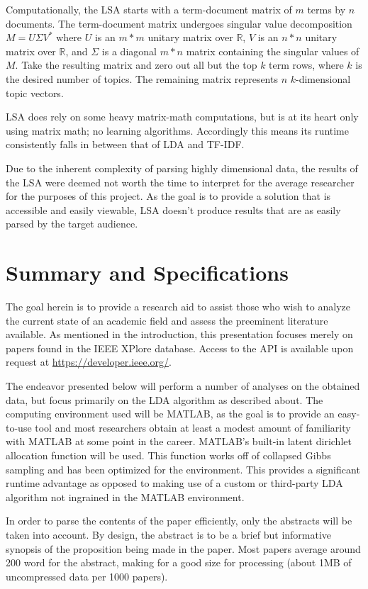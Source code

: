 \documentclass[conference]{IEEEtran}
\begin{document}
Computationally, the LSA starts with a term-document matrix of $m$ terms by $n$ documents. The term-document matrix undergoes singular value decomposition $M = U \Sigma V^*$ where $U$ is an $m*m$ unitary matrix over $\mathbb{R}$, $V$ is an $n*n$  unitary matrix over $\mathbb{R}$, and $\Sigma$ is a diagonal $m*n$ matrix containing the singular values of $M$. Take the resulting matrix and zero out all but the top $k$ term rows, where $k$ is the desired number of topics. The remaining matrix represents $n$ $k$-dimensional topic vectors.

LSA does rely on some heavy matrix-math computations, but is at its heart only using matrix math; no learning algorithms. Accordingly this means its runtime consistently falls in between that of LDA and TF-IDF.

Due to the inherent complexity of parsing highly dimensional data, the results of the LSA were deemed not worth the time to interpret for the average researcher for the purposes of this project. As the goal is to provide a solution that is accessible and easily viewable, LSA doesn't produce results that are as easily parsed by the target audience.

\section{Summary and Specifications}

The goal herein is to provide a research aid to assist those who wish to analyze the current state of an academic field and assess the preeminent literature available. As mentioned in the introduction, this presentation focuses merely on papers found in the IEEE XPlore database. Access to the API is available upon request at \url{https://developer.ieee.org/}.

The endeavor presented below will perform a number of analyses on the obtained data, but focus primarily on the LDA algorithm as described about. The computing environment used will be MATLAB, as the goal is to provide an easy-to-use tool and most researchers obtain at least a modest amount of familiarity with MATLAB at some point in the career. MATLAB's built-in latent dirichlet allocation function will be used. This function works off of collapsed Gibbs sampling and has been optimized for the environment. This provides a significant runtime advantage as opposed to making use of a custom or third-party LDA algorithm not ingrained in the MATLAB environment.

In order to parse the contents of the paper efficiently, only the abstracts will be taken into account. By design, the abstract is to be a brief but informative synopsis of the proposition being made in the paper. Most papers average around 200 word for the abstract, making for a good size for processing (about 1MB of uncompressed data per 1000 papers).
\end{document}
